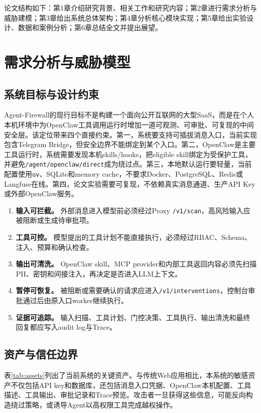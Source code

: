 \documentclass[UTF8,zihao=-4,scheme=chinese,fontset=none]{ctexart}
\newcommand{\code}[1]{{\ttfamily\small\nolinkurl{#1}}}
\begin{document}
论文结构如下：第1章介绍研究背景、相关工作和研究内容；第2章进行需求分析与威胁建模；第3章给出系统总体架构；第4章分析核心模块实现；第5章给出实验设计、数据和案例分析；第6章总结全文并提出展望。

\section{需求分析与威胁模型}

\subsection{系统目标与设计约束}

Agent-Firewall的现行目标不是构建一个面向公开互联网的大型SaaS，而是在个人本机环境中为OpenClaw工具调用运行时增加一道可观测、可审批、可复现的中间安全层。该定位带来四个直接约束。第一，系统要支持可插拔消息入口，当前实现包含Telegram Bridge，但安全边界不能绑定到某个入口。第二，OpenClaw是主要工具运行时，系统需要发现本机skills/hooks，把eligible skill绑定为受保护工具，并避免\code{/agent/openclaw/direct}成为绕过点。第三，本地默认运行要轻量，当前配置使用\code{uv}、SQLite和memory cache，不要求Docker、PostgreSQL、Redis或Langfuse在线。第四，论文实验需要可复现，不依赖真实消息通道、生产API Key或外部OpenClaw服务。

\begin{enumerate}[label=（\arabic*）]
  \item \textbf{输入可拦截。} 外部消息进入模型前必须经过Proxy \code{/v1/scan}，高风险输入应被阻断或生成待审批项。
  \item \textbf{工具可控。} 模型提出的工具计划不能直接执行，必须经过RBAC、Schema、注入、预算和确认检查。
  \item \textbf{输出可清洗。} OpenClaw skill、MCP provider和内部工具返回内容必须先扫描PII、密钥和间接注入，再决定是否进入LLM上下文。
  \item \textbf{暂停可恢复。} 被阻断或需要确认的请求应进入\code{/v1/interventions}，控制台审批通过后由原入口worker继续执行。
  \item \textbf{证据可追踪。} 输入扫描、工具计划、门控决策、工具执行、输出清洗和最终回复都应写入audit log与Trace。
\end{enumerate}

\subsection{资产与信任边界}

表\ref{tab:assets}列出了当前系统的关键资产。与传统Web应用相比，本系统的敏感资产不仅包括API key和数据库，还包括消息入口凭据、OpenClaw本机配置、工具描述、工具输出、审批记录和Trace预览。攻击者一旦获得这些信息，可能反向构造绕过策略，或诱导Agent以高权限工具完成越权操作。
\end{document}
